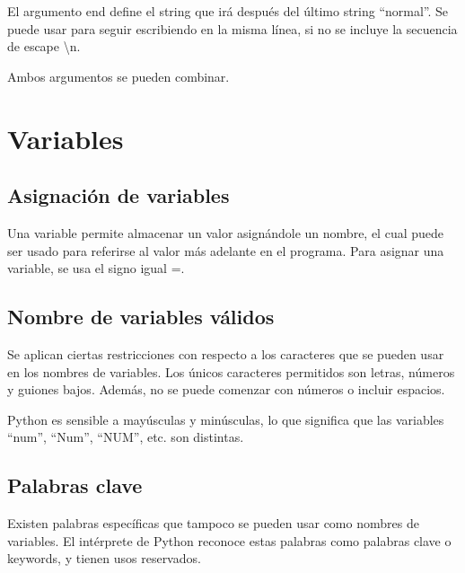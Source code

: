 \documentclass{report}
\newcommand{\doble}[1]{``#1''}
\begin{document}
{

El argumento end define el string que irá después del último string \doble{normal}. Se puede usar para seguir escribiendo en la misma línea, si no se incluye la secuencia de escape \textbackslash n.



Ambos argumentos se pueden combinar.


\clearpage\chapter{Variables}

\section{Asignación de variables}

Una variable permite almacenar un valor asignándole un nombre, el cual puede ser usado para referirse al valor más adelante en el programa. Para asignar una variable, se usa el signo igual =.


\section{Nombre de variables válidos}

Se aplican ciertas restricciones con respecto a los caracteres que se pueden usar en los nombres de variables. Los únicos caracteres permitidos son letras, números y guiones bajos. Además, no se puede comenzar con números o incluir espacios.


Python es sensible a mayúsculas y minúsculas, lo que significa que las variables \doble{num}, \doble{Num}, \doble{NUM}, etc. son distintas.


\section{Palabras clave}

Existen palabras específicas que tampoco se pueden usar como nombres de variables. El intérprete de Python reconoce estas palabras como palabras clave o keywords, y tienen usos reservados.

}
\end{document}
